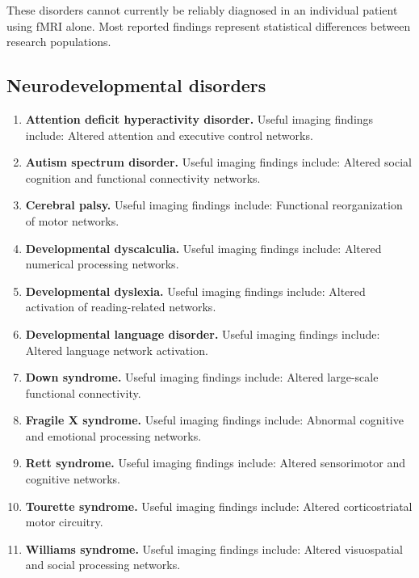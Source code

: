 These disorders cannot currently be reliably diagnosed in an individual patient using fMRI alone. Most reported findings represent statistical differences between research populations.

\subsection{Neurodevelopmental disorders}
\begin{enumerate}[leftmargin=*,itemsep=0.45em,topsep=0.4em]
\item \textbf{Attention deficit hyperactivity disorder.} Useful imaging findings include: Altered attention and executive control networks.
\item \textbf{Autism spectrum disorder.} Useful imaging findings include: Altered social cognition and functional connectivity networks.
\item \textbf{Cerebral palsy.} Useful imaging findings include: Functional reorganization of motor networks.
\item \textbf{Developmental dyscalculia.} Useful imaging findings include: Altered numerical processing networks.
\item \textbf{Developmental dyslexia.} Useful imaging findings include: Altered activation of reading-related networks.
\item \textbf{Developmental language disorder.} Useful imaging findings include: Altered language network activation.
\item \textbf{Down syndrome.} Useful imaging findings include: Altered large-scale functional connectivity.
\item \textbf{Fragile X syndrome.} Useful imaging findings include: Abnormal cognitive and emotional processing networks.
\item \textbf{Rett syndrome.} Useful imaging findings include: Altered sensorimotor and cognitive networks.
\item \textbf{Tourette syndrome.} Useful imaging findings include: Altered corticostriatal motor circuitry.
\item \textbf{Williams syndrome.} Useful imaging findings include: Altered visuospatial and social processing networks.
\end{enumerate}

